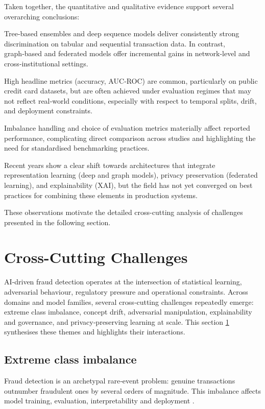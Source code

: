 \documentclass[a4paper,fleqn]{cas-dc}
\begin{document}
Taken together, the quantitative and qualitative evidence support several overarching conclusions:

Tree‑based ensembles and deep sequence models deliver consistently strong discrimination on tabular and sequential transaction data. In contrast, graph‑based and federated models offer incremental gains in network‑level and cross‑institutional settings.

High headline metrics (accuracy, AUC‑ROC) are common, particularly on public credit card datasets, but are often achieved under evaluation regimes that may not reflect real‑world conditions, especially with respect to temporal splits, drift, and deployment constraints.

Imbalance handling and choice of evaluation metrics materially affect reported performance, complicating direct comparison across studies and highlighting the need for standardised benchmarking practices.

Recent years show a clear shift towards architectures that integrate representation learning (deep and graph models), privacy preservation (federated learning), and explainability (XAI), but the field has not yet converged on best practices for combining these elements in production systems.

These observations motivate the detailed cross-cutting analysis of challenges presented in the following section.


\section{Cross-Cutting Challenges}
\label{sec:cross-cutting-challenges}
AI‑driven fraud detection operates at the intersection of statistical learning, adversarial behaviour, regulatory pressure and operational constraints. 
Across domains and model families, several cross‑cutting challenges repeatedly emerge: extreme class imbalance, concept drift, adversarial manipulation, explainability and governance, and privacy‑preserving learning at scale. 
This section \ref{sec:cross-cutting-challenges} synthesises these themes and highlights their interactions.

\subsection{Extreme class imbalance}

Fraud detection is an archetypal rare‑event problem: genuine transactions outnumber fraudulent ones by several orders of magnitude. 
This imbalance affects model training, evaluation, interpretability and deployment \cite{lalit_imbalance_2025}.
\end{document}

